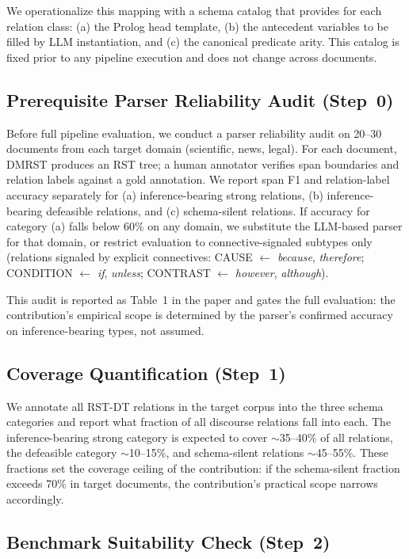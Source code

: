 \documentclass[11pt,letterpaper]{article}
\begin{document}
We operationalize this mapping with a schema catalog that provides for each relation class: (a) the Prolog head
template, (b) the antecedent variables to be filled by LLM instantiation, and (c) the canonical predicate arity.
This catalog is fixed prior to any pipeline execution and does not change across documents.

\subsection{Prerequisite Parser Reliability Audit (Step~0)}
\label{sec:audit}

Before full pipeline evaluation, we conduct a parser reliability audit on 20--30 documents from each target domain
(scientific, news, legal). For each document, DMRST produces an RST tree; a human annotator verifies span boundaries
and relation labels against a gold annotation. We report span F1 and relation-label accuracy separately for (a)
inference-bearing strong relations, (b) inference-bearing defeasible relations, and (c) schema-silent relations. If
accuracy for category (a) falls below 60\% on any domain, we substitute the \citet{Maekawa2024} LLM-based parser for
that domain, or restrict evaluation to connective-signaled subtypes only (relations signaled by explicit connectives:
CAUSE $\leftarrow$ \textit{because}, \textit{therefore}; CONDITION $\leftarrow$ \textit{if}, \textit{unless};
CONTRAST $\leftarrow$ \textit{however}, \textit{although}).

This audit is reported as Table~1 in the paper and gates the full evaluation: the contribution's empirical scope is
determined by the parser's confirmed accuracy on inference-bearing types, not assumed.

\subsection{Coverage Quantification (Step~1)}

We annotate all RST-DT relations in the target corpus into the three schema categories and report what fraction of
all discourse relations fall into each. The inference-bearing strong category is expected to cover $\sim$35--40\% of
all relations, the defeasible category $\sim$10--15\%, and schema-silent relations $\sim$45--55\%. These fractions
set the coverage ceiling of the contribution: if the schema-silent fraction exceeds 70\% in target documents, the
contribution's practical scope narrows accordingly.

\subsection{Benchmark Suitability Check (Step~2)}
\end{document}

